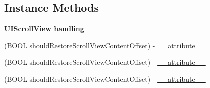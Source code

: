 \subsection*{Instance Methods}
\begin{Indent}\textbf{ U\+I\+Scroll\+View handling}\par
{\em 

 

 }\begin{DoxyCompactItemize}
\item 
(B\+O\+OL should\+Restore\+Scroll\+View\+Content\+Offset) -\/ \mbox{\hyperlink{interface_i_q_keyboard_manager_a5b51f290fc063aed13cea8483e6f7060}{\+\_\+\+\_\+attribute\+\_\+\+\_\+}}
\item 
(B\+O\+OL should\+Restore\+Scroll\+View\+Content\+Offset) -\/ \mbox{\hyperlink{interface_i_q_keyboard_manager_a5b51f290fc063aed13cea8483e6f7060}{\+\_\+\+\_\+attribute\+\_\+\+\_\+}}
\item 
(B\+O\+OL should\+Restore\+Scroll\+View\+Content\+Offset) -\/ \mbox{\hyperlink{interface_i_q_keyboard_manager_a5b51f290fc063aed13cea8483e6f7060}{\+\_\+\+\_\+attribute\+\_\+\+\_\+}}
\end{DoxyCompactItemize}
\end{Indent}
